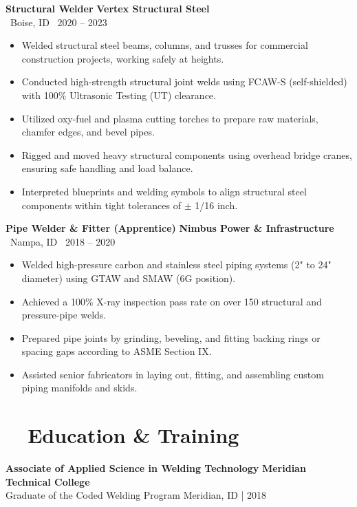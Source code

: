 \documentclass[10pt]{article}
\newcommand{\jobheader}[4]{
  \noindent
  {\bfseries\color{darktext}#1} \hfill \textbf{\color{primary}#2} \\
  {\small\color{gray}\faMapMarker~#3} \hfill {\small\color{gray}\faCalendar~#4}
  \par\vspace{3pt}
}
\begin{document}
\jobheader{Structural Welder}{Vertex Structural Steel}{Boise, ID}{2020 -- 2023}
\begin{itemize}
  \item Welded structural steel beams, columns, and trusses for commercial construction projects, working safely at heights.
  \item Conducted high-strength structural joint welds using FCAW-S (self-shielded) with 100\% Ultrasonic Testing (UT) clearance.
  \item Utilized oxy-fuel and plasma cutting torches to prepare raw materials, chamfer edges, and bevel pipes.
  \item Rigged and moved heavy structural components using overhead bridge cranes, ensuring safe handling and load balance.
  \item Interpreted blueprints and welding symbols to align structural steel components within tight tolerances of $\pm$ 1/16 inch.
\end{itemize}

\vspace{4pt}

\jobheader{Pipe Welder \& Fitter (Apprentice)}{Nimbus Power \& Infrastructure}{Nampa, ID}{2018 -- 2020}
\begin{itemize}
  \item Welded high-pressure carbon and stainless steel piping systems (2" to 24" diameter) using GTAW and SMAW (6G position).
  \item Achieved a 100\% X-ray inspection pass rate on over 150 structural and pressure-pipe welds.
  \item Prepared pipe joints by grinding, beveling, and fitting backing rings or spacing gaps according to ASME Section IX.
  \item Assisted senior fabricators in laying out, fitting, and assembling custom piping manifolds and skids.
\end{itemize}

\section*{\faGraduationCap~~Education \& Training}
\noindent
\textbf{Associate of Applied Science in Welding Technology} \hfill \textbf{Meridian Technical College} \\
{\small Graduate of the Coded Welding Program} \hfill {\small Meridian, ID | 2018}
\end{document}
